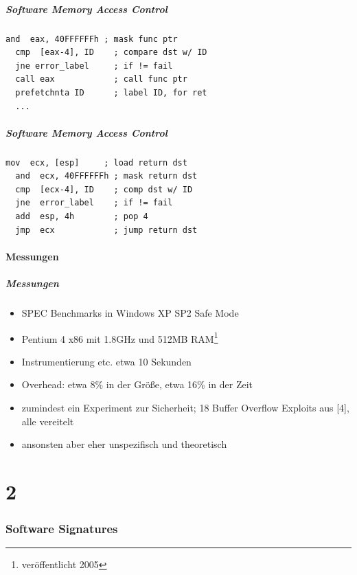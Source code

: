 \documentclass[mathserif,slidestop,compress,red]{beamer}
\begin{document}
\begin{frame}[fragile]
  \frametitle{Software Memory Access Control}
  \begin{lstlisting}[title={Call, mit SMAC}]
  and  eax, 40FFFFFFh ; mask func ptr
  cmp  [eax-4], ID    ; compare dst w/ ID
  jne error_label     ; if != fail
  call eax            ; call func ptr
  prefetchnta ID      ; label ID, for ret
  ...
  \end{lstlisting}
\end{frame}

\begin{frame}[fragile]
  \frametitle{Software Memory Access Control}
  \begin{lstlisting}[title={Return, mit SMAC}]
  mov  ecx, [esp]     ; load return dst
  and  ecx, 40FFFFFFh ; mask return dst
  cmp  [ecx-4], ID    ; comp dst w/ ID
  jne  error_label    ; if != fail
  add  esp, 4h        ; pop 4
  jmp  ecx            ; jump return dst
  \end{lstlisting}
\end{frame}

\subsection{Messungen}

\begin{frame}
  \frametitle{Messungen}
  \begin{itemize}
    \item SPEC Benchmarks in Windows XP SP2 Safe Mode
    \item Pentium 4 x86 mit 1.8GHz und 512MB RAM\footnote{veröffentlicht 2005}
    \item Instrumentierung etc. etwa 10 Sekunden
    \item Overhead: etwa 8\% in der Größe, etwa 16\% in der Zeit
    \vspace{1em}
    \item zumindest ein Experiment zur Sicherheit; 18 Buffer Overflow Exploits aus [4], alle vereitelt
    \item ansonsten aber eher unspezifisch und theoretisch
  \end{itemize}
\end{frame}

\part{2}
\section{Software Signatures}
\end{document}
